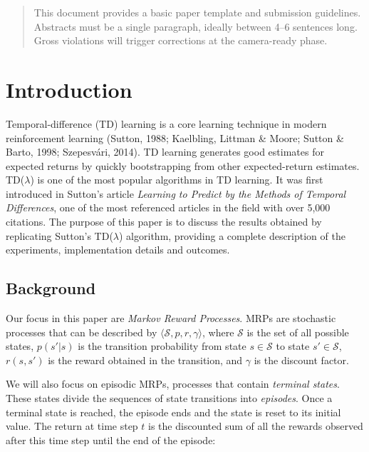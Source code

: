 \documentclass{article}
\begin{document}
    \printAffiliationsAndNotice{\icmlEqualContribution} %

    \begin{abstract}
        This document provides a basic paper template and submission guidelines.
        Abstracts must be a single paragraph, ideally between 4--6 sentences long.
        Gross violations will trigger corrections at the camera-ready phase.
    \end{abstract}

    \section{Introduction}
    \label{sec:introduction}
    Temporal-difference (TD) learning is a core learning technique in modern reinforcement learning  (Sutton, 1988; Kaelbling, Littman \& Moore; Sutton \& Barto, 1998; Szepesvári, 2014).
    TD learning generates good estimates for expected returns by quickly bootstrapping from other expected-return estimates. TD($\lambda$) is one of the most popular algorithms in TD learning.
    It was first introduced in Sutton's article \emph{Learning to Predict by the Methods of Temporal Differences}, one of the most referenced articles in the field with over 5,000 citations.
    The purpose of this paper is to discuss the results obtained by replicating Sutton's TD($\lambda$) algorithm, providing a complete description of the experiments, implementation details and outcomes.

    \subsection{Background}
    \label{subsec:background}
    Our focus in this paper are \emph{Markov Reward Processes}.
    MRPs are stochastic processes that can be described by \(\langle\mathcal{S}, p, r, \gamma\rangle\), where \(\mathcal{S}\) is the set of all possible states, \(p(s'|s)\) is the transition probability from state \(s \in \mathcal{S}\) to state \(s' \in \mathcal{S}\), \(r(s, s')\) is the reward obtained in the transition, and \(\gamma\) is the discount factor.

    We will also focus on episodic MRPs, processes that contain \emph{terminal states}.
    These states divide the sequences of state transitions into \emph{episodes}.
    Once a terminal state is reached, the episode ends and the state is reset to its initial value.
    The return at time step \(t\) is the discounted sum of all the rewards observed after this time step until the end of the episode:
\end{document}
